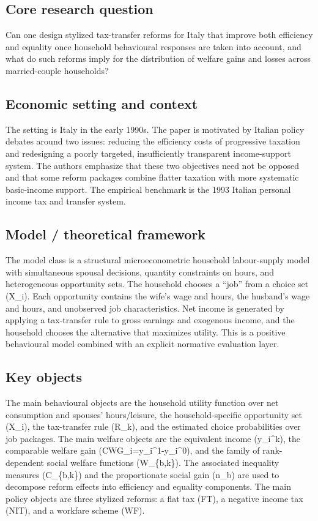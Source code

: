 \documentclass[11pt,a4paper]{article}
\begin{document}
\subsection*{Core research question}
Can one design stylized tax-transfer reforms for Italy that improve both efficiency and equality once household behavioural responses are taken into account, and what do such reforms imply for the distribution of welfare gains and losses across married-couple households?

\subsection*{Economic setting and context}
The setting is Italy in the early 1990s. The paper is motivated by Italian policy debates around two issues: reducing the efficiency costs of progressive taxation and redesigning a poorly targeted, insufficiently transparent income-support system. The authors emphasize that these two objectives need not be opposed and that some reform packages combine flatter taxation with more systematic basic-income support. The empirical benchmark is the 1993 Italian personal income tax and transfer system.

\subsection*{Model / theoretical framework}
The model class is a structural microeconometric household labour-supply model with simultaneous spousal decisions, quantity constraints on hours, and heterogeneous opportunity sets. The household chooses a “job” from a choice set (X\_i). Each opportunity contains the wife’s wage and hours, the husband’s wage and hours, and unobserved job characteristics. Net income is generated by applying a tax-transfer rule to gross earnings and exogenous income, and the household chooses the alternative that maximizes utility. This is a positive behavioural model combined with an explicit normative evaluation layer.

\subsection*{Key objects}
The main behavioural objects are the household utility function over net consumption and spouses’ hours/leisure, the household-specific opportunity set (X\_i), the tax-transfer rule (R\_k), and the estimated choice probabilities over job packages. The main welfare objects are the equivalent income (y\_i\textasciicircum{}k), the comparable welfare gain (CWG\_i=y\_i\textasciicircum{}1-y\_i\textasciicircum{}0), and the family of rank-dependent social welfare functions (W\_\{b,k\}). The associated inequality measures (C\_\{b,k\}) and the proportionate social gain (n\_b) are used to decompose reform effects into efficiency and equality components. The main policy objects are three stylized reforms: a flat tax (FT), a negative income tax (NIT), and a workfare scheme (WF).
\end{document}
